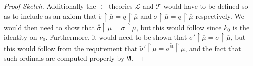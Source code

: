 \documentclass{amsart}
\theoremstyle{definition}
\theoremstyle{remark}
\newcommand{\rest}{\mathbin{\upharpoonright}}
\begin{document}
\begin{proof}[Proof Sketch]
Additionally the $\in$-theories $\mathcal L$ and $\mathcal T$ would have to be defined so as to include as an axiom that $\mathring \sigma \rest \overline{\underline{\mu}} = \underline{\sigma} \rest \overline{\underline \mu}$ and $\dot \sigma \rest \overline{\underline{\mu}} = \underline{\sigma} \rest \overline{\underline \mu}$ respectively. 
We would then need to show that $\overset{*}\sigma \rest \overline{\mu} = \sigma \rest \overline{\mu}$, but this would follow since $k_0$ is the identity on $\nu_0$. 
Furthermore, it would need to be shown that $\sigma' \rest \overline{\mu} = \sigma \rest \overline{\mu}$, but this would follow from the requirement that $\tilde \sigma' \rest \overline{\mu} = \underline{\sigma}^{\tilde{\mathfrak A}} \rest \overline{\mu}$, and the fact that such ordinals are computed properly by $\tilde{\mathfrak A}$. 
\end{proof}




\end{document}
